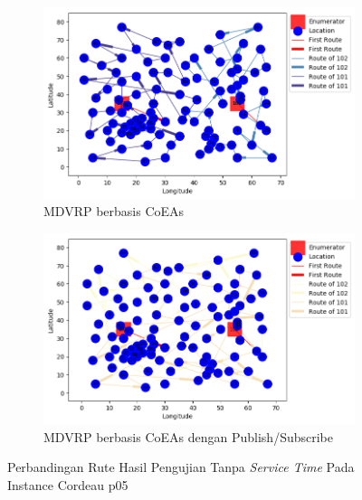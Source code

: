 \begin{figure}[H]
	\centering
	\begin{subfigure}[t]{\textwidth}
		\centering
		\includegraphics[width=\textwidth]{Resources/Images/cordeau_p05/cordeau_p05_notw_coes}
		\caption{MDVRP berbasis CoEAs}
		\label{fig:cordeau_p05_notw_coes}
	\end{subfigure}
	\begin{subfigure}[t]{\textwidth}
		\centering
		\includegraphics[width=\textwidth]{Resources/Images/cordeau_p05/cordeau_p05_notw_pubsub_coes}
		\caption{MDVRP berbasis CoEAs dengan Publish/Subscribe}
		\label{fig:cordeau_p05_notw_pubsub_coes}
	\end{subfigure}
	\caption{Perbandingan Rute Hasil Pengujian Tanpa \textit{Service Time} Pada Instance Cordeau p05}
	\label{fig:cordeau_p05_notw}
\end{figure}


